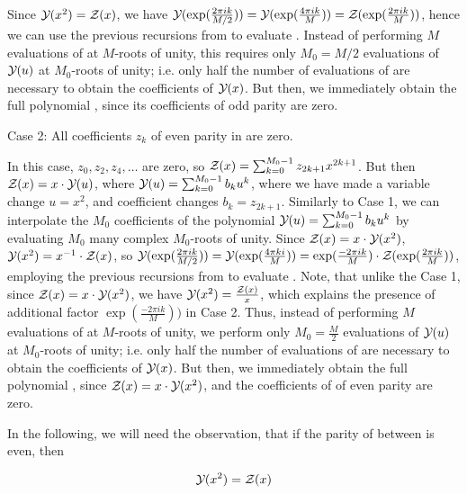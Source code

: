 Since ${\mathcal Y}_{}(x^2)={\mathcal Z}_{}(x)$, we have
${\mathcal Y}_{}(\exp(\frac{2\pi i k}{M/2})) =
{\mathcal Y}_{}(\exp(\frac{4\pi i k}{M})) =
{\mathcal Z}_{}(\exp(\frac{2\pi i k}{M}))$, hence we can
use the previous recursions from 
to evaluate .  Instead of
performing $M$ evaluations of \fullZx at $M$-roots of unity,
this requires only $M_0=M/2$ evaluations of ${\mathcal Y}_{}(u)$ at
$M_0$-roots of unity; i.e. only half the number of
evaluations of \fullZx are necessary to
obtain the coefficients of ${\mathcal Y}_{}(x)$. But then, we immediately obtain the
full polynomial \fullZx, since its coefficients of odd parity are zero.

\medskip
{\sc Case 2}: All coefficients $z_k$ of even parity in
 are zero.
\smallskip

In this case, $z_0,z_2,z_4,\dots$ are zero, so
${\mathcal Z}_{}(x) = \sum_{k=0}^{M_0-1} z_{2k+1} x^{2k+1}$. But then
${\mathcal Z}_{}(x) = x \cdot {\mathcal Y}_{}(u)$, where
${\mathcal Y}_{}(u)= \sum_{k=0}^{M_0-1} b_k u^k$, where we have made
a variable change $u=x^2$, and coefficient changes
$b_k = z_{2k+1}$. Similarly to Case 1,
we can interpolate the $M_0$ coefficients of the polynomial
${\mathcal Y}_{}(u) = \sum_{k=0}^{M_0-1} b_k u^k$
by evaluating $M_0$ many complex $M_0$-roots
of unity.  Since ${\mathcal Z}_{}(x)=x \cdot {\mathcal Y}_{}(x^2)$, ${\mathcal Y}_{}(x^2) = x^{-1} \cdot {\mathcal Z}_{}(x)$,
so
${\mathcal Y}_{}(\exp(\frac{2\pi i k}{M/2})) = {\mathcal Y}_{}(\exp(\frac{4\pi ki}{M})) =
\exp(\frac{-2\pi i k}{M}) \cdot
{\mathcal Z}_{}(\exp(\frac{2\pi i k}{M}))$, employing
the previous recursions from 
to evaluate .  Note, that unlike the
Case 1, since ${\mathcal Z}_{}(x) = x \cdot {\mathcal Y}_{}(x^2)$, we have
${\mathcal Y}_{}(x^2)=\frac{{\mathcal Z}_{}(x)}{x}$, which explains the presence of additional factor
$\exp(\frac{-2\pi i k}{M}))$ in Case 2.  Thus, instead of
performing $M$ evaluations of \fullZx at $M$-roots of unity,
we perform only $M_0=\frac{M}{2}$ evaluations of ${\mathcal Y}_{}(u)$ at
$M_0$-roots of unity; i.e. only half the number of
evaluations of \fullZx are necessary to
obtain the coefficients of ${\mathcal Y}_{}(x)$. But then, we immediately obtain the
full polynomial \fullZx, since ${\mathcal Z}_{}(x) = x \cdot {\mathcal Y}_{}(x^2)$, and the
coefficients of \fullZx of even parity are zero.

In the following, we will need the observation, that if the parity of
\bpd \dBP{\strA}{\strB} between \strAB is
even, then

\begin{align}
\label{eq:ffttwo:evenY}
\emYof{}{x^2} = \fullZx
\end{align}

